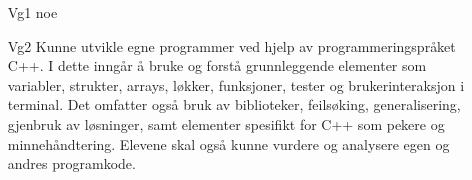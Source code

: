		\begin{itemize}

			\item[Vg1] noe

			\item[Vg2] Kunne utvikle egne programmer ved hjelp av programmeringspråket C++. I dette inngår å bruke og forstå grunnleggende elementer som variabler, strukter, arrays, løkker, funksjoner, tester og brukerinteraksjon i terminal. Det omfatter også bruk av biblioteker, feilsøking, generalisering, gjenbruk av løsninger, samt elementer spesifikt for C++ som pekere og minnehåndtering. Elevene skal også kunne vurdere og analysere egen og andres programkode.

		\end{itemize}
